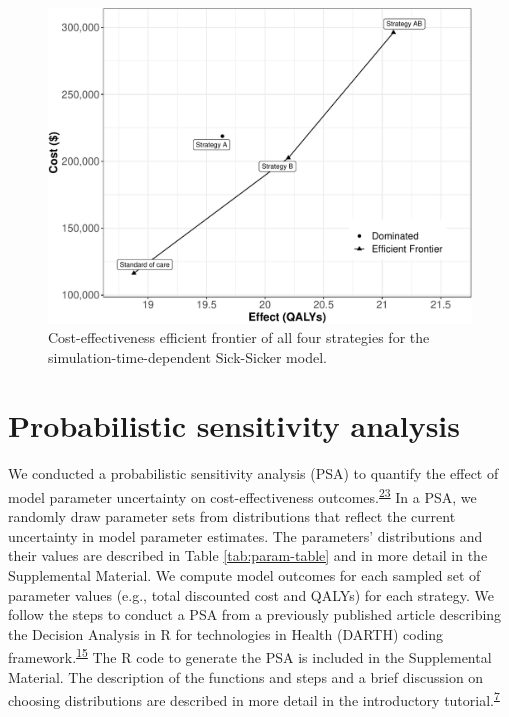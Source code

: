 \documentclass[
]{article}
\begin{document}
\begin{figure}[H]

{\centering \includegraphics{figs/Sick-Sicker-CEA-AgeDep-1} 

}

\caption{Cost-effectiveness efficient frontier of all four strategies for the simulation-time-dependent Sick-Sicker model.}\label{fig:Sick-Sicker-CEA-AgeDep}
\end{figure}

\hypertarget{probabilistic-sensitivity-analysis}{%
\section{Probabilistic sensitivity analysis}\label{probabilistic-sensitivity-analysis}}

We conducted a probabilistic sensitivity analysis (PSA) to quantify the effect of model parameter uncertainty on cost-effectiveness outcomes.\textsuperscript{\protect\hyperlink{ref-Briggs2012}{23}} In a PSA, we randomly draw parameter sets from distributions that reflect the current uncertainty in model parameter estimates. The parameters' distributions and their values are described in Table \ref{tab:param-table} and in more detail in the Supplemental Material. We compute model outcomes for each sampled set of parameter values (e.g., total discounted cost and QALYs) for each strategy. We follow the steps to conduct a PSA from a previously published article describing the Decision Analysis in R for technologies in Health (DARTH) coding framework.\textsuperscript{\protect\hyperlink{ref-Alarid-Escudero2019e}{15}} The R code to generate the PSA is included in the Supplemental Material. The description of the functions and steps and a brief discussion on choosing distributions are described in more detail in the introductory tutorial.\textsuperscript{\protect\hyperlink{ref-Alarid-Escudero2021a}{7}}
\end{document}
